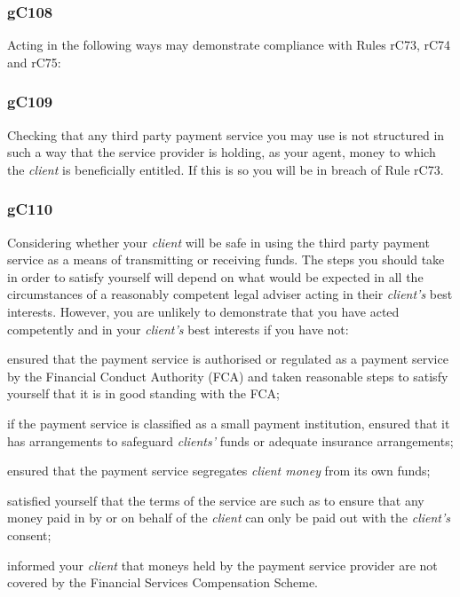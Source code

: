 \subsubsection{\color{darkgrey}gC108}

Acting in the following ways may demonstrate compliance with Rules rC73,
rC74 and rC75:

\subsubsection{\color{darkgrey}gC109}

Checking that any third party payment service you may use is not
structured in such a way that the service provider is holding, as your
agent, money to which the \emph{client} is beneficially entitled. If
this is so you will be in breach of Rule rC73.

\subsubsection{\color{darkgrey}gC110}

Considering whether your \emph{client} will be safe in using the third
party payment service as a means of transmitting or receiving funds. The
steps you should take in order to satisfy yourself will depend on what
would be expected in all the circumstances of a reasonably competent
legal adviser acting in their \emph{client's} best interests. However,
you are unlikely to demonstrate that you have acted competently and in
your \emph{client's} best interests if you have not:
\begin{numlist}\item ensured that the payment service is authorised or regulated as a
payment service by the Financial Conduct Authority (FCA) and taken
reasonable steps to satisfy yourself that it is in good standing with
the FCA;
\item if the payment service is classified as a small payment institution,
ensured that it has arrangements to safeguard \emph{clients'} funds or
adequate insurance arrangements;
\item ensured that the payment service segregates \emph{client money} from
its own funds;
\item satisfied yourself that the terms of the service are such as to
ensure that any money paid in by or on behalf of the \emph{client} can
only be paid out with the \emph{client's} consent;
\item informed your \emph{client} that moneys held by the payment service
provider are not covered by the Financial Services Compensation Scheme.
\end{numlist}
